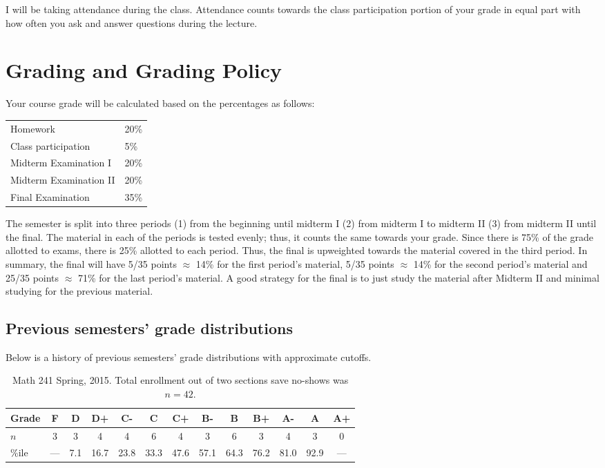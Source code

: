 \documentclass[12pt]{article}
\begin{document}
I will be taking attendance during the class. Attendance counts towards the class participation portion of your grade in equal part with how often you ask and answer questions during the lecture.


\section*{Grading and Grading Policy}\label{sec:grading}

Your course grade will be calculated based on the percentages as follows: 

\begin{table}[h]
\centering
\begin{tabular}{l|l}
Homework & 20\% \\
Class participation & 5\% \\
Midterm Examination I & 20\%\\
Midterm Examination II & 20\%\\
Final Examination & 35\%
\end{tabular}
\end{table}
\FloatBarrier

The semester is split into three periods (1) from the beginning until midterm I (2) from midterm I to midterm II (3) from midterm II until the final. The material in each of the periods is tested evenly; thus, it counts the same towards your grade. Since there is 75\% of the grade allotted to exams, there is 25\% allotted to each period. Thus, the final is upweighted towards the material covered in the third period. In summary, the final will have 5/35 points $\approx$ 14\% for the first period's material, 5/35 points $\approx$ 14\% for the second period's material and 25/35 points $\approx$ 71\% for the last period's material. A good strategy for the final is to just study the material after Midterm II and minimal studying for the previous material.

\subsection*{Previous semesters' grade distributions}

Below is a history of previous semesters' grade distributions with approximate cutoffs.

\begin{table}[htp]
\centering
\begin{tabular}{l|cccccccccccc}
Grade & F   & D      & D+   & C-    & C     & C+    & B-    & B     & B+   & A-    & A      & A+ \\ \hline
$n$   & 3    & 3      & 4      & 4      & 6     & 4      & 3     & 6      & 3     & 4      & 3      & 0 \\
\%ile & --- & 7.1  &  16.7 & 23.8 & 33.3 & 47.6 & 57.1 & 64.3 & 76.2 &  81.0 & 92.9 & --- \\ \hline
\end{tabular}
\caption{Math 241 Spring, 2015. Total enrollment out of two sections save no-shows was $n=42$.}
\end{table}
\end{document}
